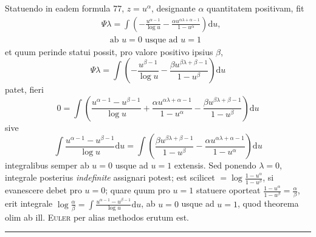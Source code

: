 Statuendo in eadem formula 77, $z=u^\alpha$, designante $\alpha$ quantitatem
positivam, fit
\[
\begin{aligned}
&\Psi\lambda=\int\left(-\frac{u^{\alpha-1}}{\log u}
-\frac{\alpha u^{\alpha\lambda+\alpha-1}}{1-u^\alpha}\right)\mathrm{d}u,
\\[4pt]
&\quad\text{ab }u=0\text{ usque ad }u=1
\end{aligned}
\]
et quum perinde statui possit, pro valore positivo ipsius $\beta$,
\[
\Psi\lambda=\int\left(-\frac{u^{\beta-1}}{\log u}
-\frac{\beta u^{\beta\lambda+\beta-1}}{1-u^\beta}\right)\mathrm{d}u
\]
patet, fieri
\[
0=\int\left(\frac{u^{\alpha-1}-u^{\beta-1}}{\log u}
+\frac{\alpha u^{\alpha\lambda+\alpha-1}}{1-u^\alpha}
-\frac{\beta u^{\beta\lambda+\beta-1}}{1-u^\beta}\right)\mathrm{d}u
\]
sive
\[
\int\frac{u^{\alpha-1}-u^{\beta-1}}{\log u}\mathrm{d}u
=\int\left(\frac{\beta u^{\beta\lambda+\beta-1}}{1-u^\beta}
-\frac{\alpha u^{\alpha\lambda+\alpha-1}}{1-u^\alpha}\right)\mathrm{d}u
\]
integralibus semper ab $u=0$ usque ad $u=1$ extensis. Sed ponendo $\lambda=0$,
integrale posterius \emph{indefinite} assignari potest; est scilicet
$=\log\frac{1-u^\alpha}{1-u^\beta}$, si evanescere debet pro $u=0$;
quare quum pro $u=1$ statuere oporteat
$\frac{1-u^\alpha}{1-u^\beta}=\frac{\alpha}{\beta}$,
erit integrale
$\log\frac{\alpha}{\beta}=\int\frac{u^{\alpha-1}-u^{\beta-1}}{\log u}\mathrm{d}u$,
ab $u=0$ usque ad $u=1$, quod theorema olim ab ill. \textsc{Euler} per alias
methodos erutum est.
\par\medskip\noindent\hfill\rule{.25\linewidth}{.4pt}\hfill\par
